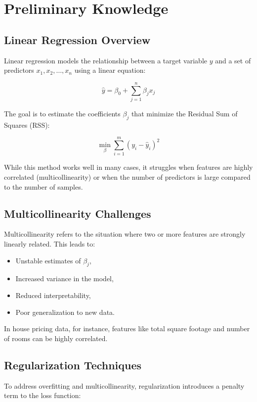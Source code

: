 \documentclass[12pt, a4paper]{report}
\begin{document}
\chapter{Preliminary Knowledge}
\section{ Linear Regression Overview}

Linear regression models the relationship between a target variable \( y \) and a set of predictors \( x_1, x_2, \ldots, x_n \) using a linear equation:

\[
\hat{y} = \beta_0 + \sum_{j=1}^{n} \beta_j x_j
\]

The goal is to estimate the coefficients \( \beta_j \) that minimize the Residual Sum of Squares (RSS):

\[
\min_{\beta} \sum_{i=1}^{m} (y_i - \hat{y}_i)^2
\]

While this method works well in many cases, it struggles when features are highly correlated (multicollinearity) or when the number of predictors is large compared to the number of samples.

\section{ Multicollinearity Challenges}

Multicollinearity refers to the situation where two or more features are strongly linearly related. This leads to:

\begin{itemize}
    \item Unstable estimates of \( \beta_j \),
    \item Increased variance in the model,
    \item Reduced interpretability,
    \item Poor generalization to new data.
\end{itemize}

In house pricing data, for instance, features like total square footage and number of rooms can be highly correlated.

\section{ Regularization Techniques}

To address overfitting and multicollinearity, regularization introduces a penalty term to the loss function:
\end{document}

